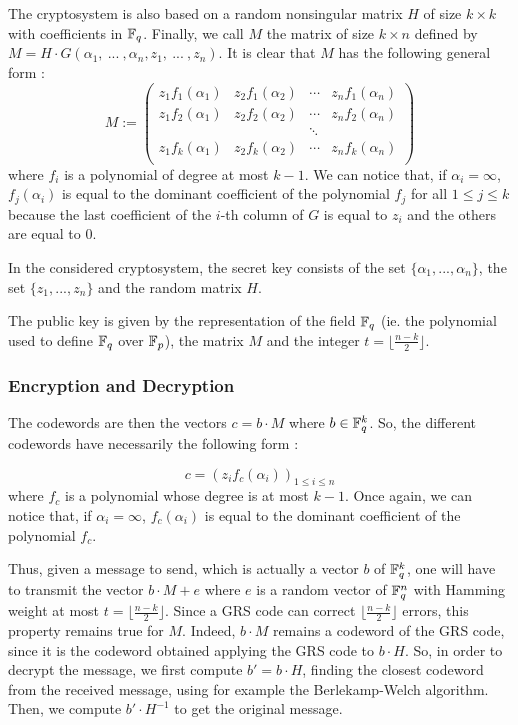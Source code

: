\documentclass[a4paper]{article}
\begin{document}
The cryptosystem is also based on a random nonsingular matrix $H$ of size $k\times k$ with coefficients in $\mathbb{F}_q$. Finally, we call $M$ the matrix of size $k\times n$ defined by $M=H\cdot G(\alpha_1, \ ... \ , \alpha_n, z_1, \ ... \ , z_n)$.
It is clear that $M$ has the following general form :
$$ M := \left(
\begin{array}{cccc}
z_1f_1(\alpha_1) &  z_2f_1(\alpha_2) & \cdots & z_nf_1(\alpha_n) \\
z_1f_2(\alpha_1) &  z_2f_2(\alpha_2) & \cdots & z_nf_2(\alpha_n) \\
 & & \ddots & \\
z_1f_k(\alpha_1) &  z_2f_k(\alpha_2) & \cdots & z_nf_k(\alpha_n) \\
\end{array}
\right)$$
where $f_i$ is a polynomial of degree at most $k-1$.
We can notice that, if $\alpha_i = \infty$, $f_j(\alpha_i)$ is equal to the dominant coefficient of the polynomial $f_j$ for all $1\leq j\leq k$ because the last coefficient of the $i$-th column of $G$ is equal to $z_i$ and the others are equal to $0$.

In the considered cryptosystem, the secret key consists of the set $\{\alpha_1,... ,\alpha_n\}$, the set $\{z_1,... ,z_n\}$ and the random matrix $H$.

The public key is given by the representation of the field $\mathbb{F}_q$ (ie. the polynomial used to define $\mathbb{F}_q$ over $\mathbb{F}_p$), the matrix $M$ and the integer $t=\lfloor\frac{n-k}{2}\rfloor$.

\subsubsection{Encryption and Decryption}
The codewords are then the vectors $c=b\cdot M$ where $b\in\mathbb{F}_q^k$. So, the different codewords have necessarily the following form :

$$c=(z_if_c(\alpha_i))_{1\leq i\leq n}$$ where $f_c$ is a polynomial whose degree is at most $k-1$.
Once again, we can notice that, if $\alpha_i = \infty$, $f_c(\alpha_i)$ is equal to the dominant coefficient of the polynomial $f_c$.

Thus, given a message to send, which is actually a vector $b$ of $\mathbb{F}_q^k$, one will have to transmit the vector $b\cdot M + e$ where $e$ is a random vector of $\mathbb{F}_q^n$ with Hamming weight at most $t=\lfloor\frac{n-k}{2}\rfloor$.
Since a GRS code can correct $\lfloor\frac{n-k}{2}\rfloor$ errors, this property remains true for $M$. Indeed, $b\cdot M$ remains a codeword of the GRS code, since it is the codeword obtained applying the GRS code to $b\cdot H$.
So, in order to decrypt the message, we first compute $b'=b\cdot H$, finding the closest codeword from the received message, using for example the Berlekamp-Welch algorithm.
Then, we compute $b'\cdot H^{-1}$ to get the original message.
\end{document}
